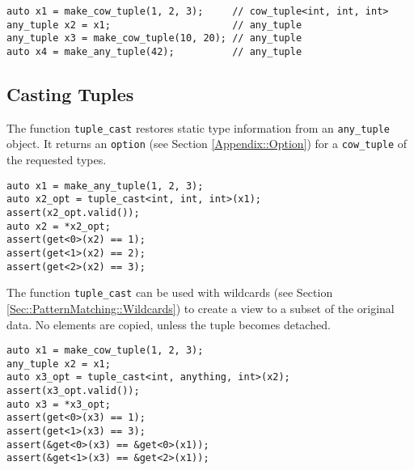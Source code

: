 \begin{lstlisting}
auto x1 = make_cow_tuple(1, 2, 3);     // cow_tuple<int, int, int>
any_tuple x2 = x1;                     // any_tuple
any_tuple x3 = make_cow_tuple(10, 20); // any_tuple
auto x4 = make_any_tuple(42);          // any_tuple
\end{lstlisting}

\clearpage
\subsection{Casting Tuples}

The function \lstinline^tuple_cast^ restores static type information
from an \lstinline^any_tuple^ object.
It returns an \lstinline^option^ (see Section \ref{Appendix::Option})
for a \lstinline^cow_tuple^ of the requested types.

\begin{lstlisting}
auto x1 = make_any_tuple(1, 2, 3);
auto x2_opt = tuple_cast<int, int, int>(x1);
assert(x2_opt.valid());
auto x2 = *x2_opt;
assert(get<0>(x2) == 1);
assert(get<1>(x2) == 2);
assert(get<2>(x2) == 3);
\end{lstlisting}

The function \lstinline^tuple_cast^ can be used with wildcards (see Section \ref{Sec::PatternMatching::Wildcards}) to create a view to a subset of the original data.
No elements are copied, unless the tuple becomes detached.

\begin{lstlisting}
auto x1 = make_cow_tuple(1, 2, 3);
any_tuple x2 = x1;
auto x3_opt = tuple_cast<int, anything, int>(x2);
assert(x3_opt.valid());
auto x3 = *x3_opt;
assert(get<0>(x3) == 1);
assert(get<1>(x3) == 3);
assert(&get<0>(x3) == &get<0>(x1));
assert(&get<1>(x3) == &get<2>(x1));
\end{lstlisting}
